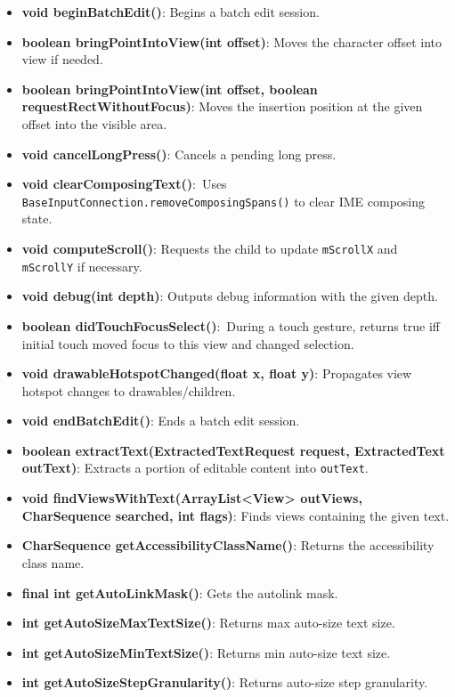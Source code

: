 \documentclass{report}
\begin{document}
\begin{itemize}
\begin{itemize}
                \item \textbf{void beginBatchEdit()}: Begins a batch edit session.
                \item \textbf{boolean bringPointIntoView(int offset)}: Moves the character offset into view if needed.
                \item \textbf{boolean bringPointIntoView(int offset, boolean requestRectWithoutFocus)}: Moves the insertion position at the given offset into the visible area.
                \item \textbf{void cancelLongPress()}: Cancels a pending long press.
                \item \textbf{void clearComposingText()}:\ Uses \texttt{BaseInputConnection.removeComposingSpans()} to clear IME composing state.
                \item \textbf{void computeScroll()}: Requests the child to update \texttt{mScrollX} and \texttt{mScrollY} if necessary.
                \item \textbf{void debug(int depth)}: Outputs debug information with the given depth.
                \item \textbf{boolean didTouchFocusSelect()}:\ During a touch gesture, returns true iff initial touch moved focus to this view and changed selection.
                \item \textbf{void drawableHotspotChanged(float x, float y)}: Propagates view hotspot changes to drawables/children.
                \item \textbf{void endBatchEdit()}: Ends a batch edit session.
                \item \textbf{boolean extractText(ExtractedTextRequest request, ExtractedText outText)}: Extracts a portion of editable content into \texttt{outText}.
                \item \textbf{void findViewsWithText(ArrayList<View> outViews, CharSequence searched, int flags)}: Finds views containing the given text.
                \item \textbf{CharSequence getAccessibilityClassName()}: Returns the accessibility class name.
                \item \textbf{final int getAutoLinkMask()}: Gets the autolink mask.
                \item \textbf{int getAutoSizeMaxTextSize()}: Returns max auto-size text size.
                \item \textbf{int getAutoSizeMinTextSize()}: Returns min auto-size text size.
                \item \textbf{int getAutoSizeStepGranularity()}: Returns auto-size step granularity.

\end{itemize}
\end{itemize}
\end{document}
